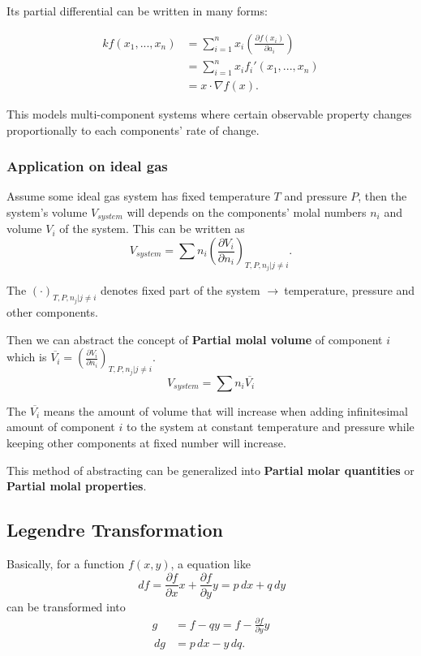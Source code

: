 \documentclass[11pt,a4paper,fleqn]{article}
\numberwithin{equation}{section}
\newcommand{\go}{$ \rightarrow\ $}
\newcommand{\Concept}{\textbf}
\newcommand{\Del}{\ensuremath{\nabla}}
\newcommand{\D}{\ensuremath{\,d}}
\begin{document}
Its partial differential can be written in many forms:

\begin{align}
  k f(x_1,...,x_n)
  & = \sum_{i=1}^{n} x_i \left(\frac{\partial f(x_i)}{\partial a_i} \right) \\
  & = \sum_{i=1}^{n} x_i f_i'(x_1,...,x_n) \\
  & = x\cdot\Del f(x).
\end{align}

This models multi-component systems where certain observable property changes proportionally to each components' rate of change.

\subsubsection{Application on ideal gas}
Assume some ideal gas system has fixed temperature $T$ and pressure $P$, then the system's volume $V_{system}$ will depends on the components' molal numbers $n_i$ and volume $V_i$ of the system. This can be written as
\begin{equation}
  V_{system} = \sum n_i \left( \frac{\partial V_i}{\partial n_i} \right)_{T,P,{n_j|j\neq i}}.
\end{equation}

The $\left( \cdotp \right)_{T,P,{n_j|j\neq i}}$ denotes fixed part of the system \go temperature, pressure and other components.

Then we can abstract the concept of \Concept{Partial molal volume} of component $i$ which is $\overline{V_i} = \left( \frac{\partial V_i}{\partial n_i} \right)_{T,P,{n_j|j\neq i}}$.
\begin{equation}
  V_{system} =\sum n_i \overline{V_i}
\end{equation}

The $\overline{V_i}$ means the amount of volume that will increase when adding infinitesimal amount of component $i$ to the system at constant temperature and pressure while keeping other components at fixed number will increase.

This method of abstracting can be generalized into \Concept{Partial molar quantities} or \Concept{Partial molal properties}.

\subsection{Legendre Transformation}

Basically, for a function $f(x,y)$, a equation like
\begin{equation}
  \D f = \frac{\partial f}{\partial x} x + \frac{\partial f}{\partial y} y= p \D x + q \D y
\end{equation} can be transformed into
\begin{align}
  g &= f - qy = f - \frac{\partial f}{\partial y}y\\
 \D g &= p \D x - y \D q.
\end{align}
\end{document}
